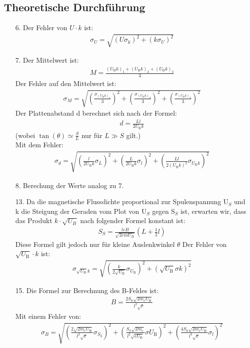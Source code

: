 \documentclass[12pt]{scrartcl}
\begin{document}
\subsection{Theoretische Durchführung}
\begin{itemize}
\item[6.]
Der Fehler von $U \cdot k$ ist:
\begin{align}
\sigma_U = \sqrt{\left(U \sigma_k \right)^2+\left(k \sigma_U\right)^2}
\end{align}
\item[7.]
Der Mittelwert ist:
\begin{align}
M = \frac{(U_{\text{B}}k)_1+
(U_{\text{B}}k)_2+
(U_{\text{B}}k)_3}{3}
\end{align}
Der Fehler auf den Mittelwert ist:
\begin{align}
\sigma_M =\sqrt{
\left(\frac{\sigma_{(U_{\text{B}}k)_1}}{3}\right)^2+ \left(\frac{\sigma_{(U_{\text{B}}k)_2}}{3}\right)^2+
\left(\frac{\sigma_{(U_{\text{B}}k)_3}}{3}\right)^2}
\end{align}
Der Plattenabstand d berechnet sich nach der Formel:
\begin{align}
d= \frac{L l}{2 U_\text{B} k}
\label{eqn: Plattenabstand}
\end{align}
(wobei $\tan(\theta) \simeq \frac{S}{L}$ nur für $L \gg S$ gilt.)\\
Mit dem Fehler:
\begin{align}
\sigma_d = \sqrt{
\left(\frac{l}{2 U_\text{B} k}\sigma_{L}\right)^2+
\left(\frac{L}{2 U_\text{B} k}\sigma_l\right)^2+
\left(\frac{L l}{2 (U_\text{B} k)^2}\sigma_{U_\text{B} k}\right)^2}
\end{align}
\item[8.]
Berechung der Werte analog zu 7.
\item[13.]
Da die magnetische Flussdichte proportional zur Spulenspannung U$_S$ und k die Steigung der Geraden vom Plot von U$_S$ gegen S$_S$ ist, erwarten wir, dass das Produkt $k\cdot\sqrt{U_B}$ nach folgender Formel konstant ist:
\begin{align}
S_S = \frac{leB}{\sqrt{2em U_B}}(L+\frac{1}{2}l)
\label{eqn: Auslenkung Spulenspannung}
\end{align}
Diese Formel gilt jedoch nur für kleine Auslenkwinkel $\theta$
Der Fehler von $\sqrt{U_\text{B}} \cdot k$ ist:
\begin{align}
\sigma_{\sqrt{U_\text{B}}k} = \sqrt{
\left(\frac{k}{2\sqrt{U_\text{B}}}\sigma_{U_\text{B}}\right)^2+
\left(\sqrt{U_\text{B}}\sigma{k}\right)^2}
\end{align}
\item[15.]
Die Formel zur Berechnung des B-Feldes ist:
\begin{align}
B = \frac{2 S_\text{S}\sqrt{2 m_e U_\text{B}}}{l^2 \sqrt{e}}
\end{align}
Mit einem Fehler von:
\begin{align}
\sigma_B = \sqrt{
\left(\frac{2 \sqrt{2 m_e U_\text{B}}}{l^2 \sqrt{e}}\sigma_{S_\text{S}}\right)^2+
\left(\frac{S_\text{S}\sqrt{2 m_e}}{l^2 \sqrt{e U_\text{B}}}\sigma{U_\text{B}}\right)^2+
\left(\frac{4 S_\text{S}\sqrt{2 m_e U_\text{B}}}{l^3 \sqrt{e}}\sigma_l\right)^2
}
\end{align}
\end{itemize}
\end{document}
